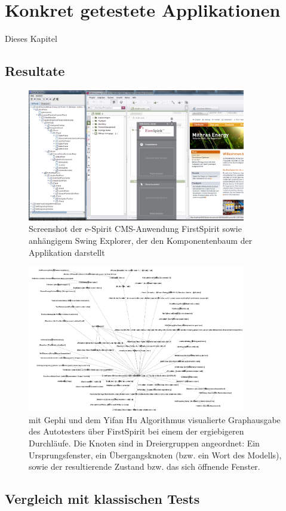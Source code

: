 \chapter{Konkret getestete Applikationen}\label{chapter:concretetests}


Dieses Kapitel


\section{Resultate}\label{section:testresults}

\begin{figure}
	\centering
	\includegraphics[width=0.85\textwidth]{bilder/screenshot_freespirit.png}
	\caption{Screenshot der e-Spirit CMS-Anwendung FirstSpirit \cite{website:firstspirit} 
	sowie anhängigem Swing Explorer, der den Komponentenbaum der Applikation darstellt}
	\label{fig:screenshot_freespirit}
\end{figure}

\begin{figure}
	\centering
	\includegraphics[width=0.85\textwidth]{bilder/model_freespirit.png}
	\caption{mit Gephi \cite{website:gephi} und dem Yifan Hu Algorithmus \cite{hu2005efficient} visualierte Graphausgabe 
	des Autotesters über FirstSpirit bei einem der ergiebigeren Durchläufe.
	Die Knoten sind in Dreiergruppen angeordnet: Ein Ursprungsfenster, ein Übergangsknoten (bzw. ein Wort des Modells), 
	sowie der resultierende Zustand bzw. das sich öffnende Fenster.}
	\label{fig:model_freespirit_06.10.2015}
\end{figure}


\section{Vergleich mit klassischen Tests}\label{section:testcomparisonclassic}

